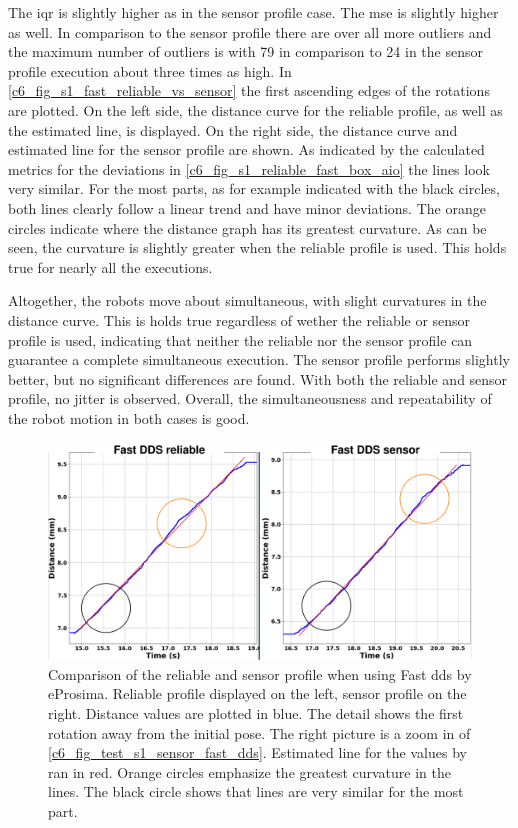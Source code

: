 The \gls{iqr} is slightly higher as in the sensor profile case. The \gls{mse} is slightly higher as well. In comparison to the sensor profile there are over all more outliers and the maximum number of outliers is with 79 in comparison to 24 in the sensor profile execution about three times as high.\newline
In \autoref{c6_fig_s1_fast_reliable_vs_sensor} the first ascending edges of the rotations are plotted. On the left side, the distance curve for the reliable profile, as well as the estimated line, is displayed. On the right side, the distance curve and estimated line for the sensor profile are shown. As indicated by the calculated metrics for the deviations in \autoref{c6_fig_s1_reliable_fast_box_aio} the lines look very similar. For the most parts, as for example indicated with the black circles, both lines clearly follow a linear trend and have minor deviations. The orange circles indicate where the distance graph has its greatest curvature. As can be seen, the curvature is slightly greater when the reliable profile is used. This holds true for nearly all the executions.

Altogether, the robots move about simultaneous, with slight curvatures in the distance curve. This is holds true regardless of wether the reliable or sensor profile is used, indicating that neither the reliable nor the sensor profile can guarantee a complete simultaneous execution. The sensor profile performs slightly better, but no significant differences are found. With both the reliable and sensor profile, no jitter is observed. Overall, the simultaneousness and repeatability of the robot motion in both cases is good.
\begin{figure}[hhtpb]
	\centering
	\includegraphics[width=1\textwidth]{Figures/c6/s1/s1_fast_dds_reliable_vs_sensor.png}
	\caption{Comparison of the reliable and sensor profile when using Fast \gls{dds} by eProsima. Reliable profile displayed on the left, sensor profile on the right. Distance values are plotted in blue. The detail shows the first rotation away from the initial pose. The right picture is a zoom in of \autoref{c6_fig_test_s1_sensor_fast_dds}.  Estimated line for the values by \gls{ran} in red. Orange circles emphasize the greatest curvature in the lines. The black circle shows that lines are very similar for the most part.}
	\label{c6_fig_s1_fast_reliable_vs_sensor}
\end{figure}

